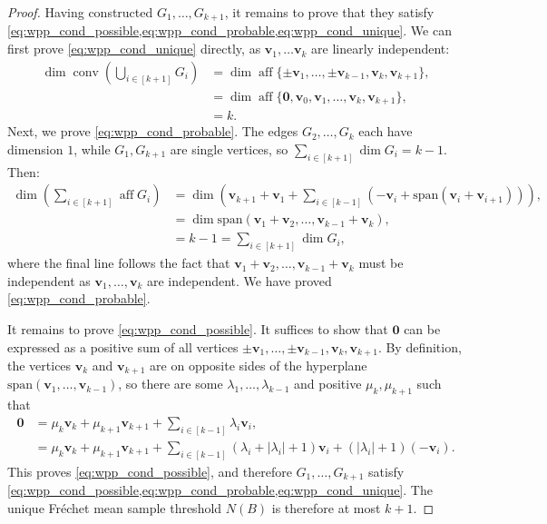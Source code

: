 \documentclass[10pt]{article}
\theoremstyle{definition}
\theoremstyle{remark}
\DeclareMathOperator{\conv}{conv}
\DeclareMathOperator{\aff}{aff}
\renewcommand{\vec}[1]{\mathbf{#1}}
\begin{document}
\begin{proof}
		Having constructed $G_1, \dots, G_{k+1}$, it remains to prove that they satisfy \cref{eq:wpp_cond_possible,eq:wpp_cond_probable,eq:wpp_cond_unique}. We can first prove \cref{eq:wpp_cond_unique} directly, as $\vec v_1, \dots \vec v_k$ are linearly independent:
		\begin{align*}
			\dim \conv \left( \textstyle\bigcup_{i \in [k+1]} G_i  \right) &= \dim \aff \{ \pm \vec v_1, \dots, \pm \vec v_{k-1}, \vec v_k, \vec v_{k+1} \}, \\
			&= \dim \aff \{\vec 0, \vec v_0, \vec v_1, \dots, \vec v_k, \vec v_{k+1} \}, \\
			&= k.
		\end{align*}
		Next, we prove \cref{eq:wpp_cond_probable}. The edges $G_2, \dots, G_k$ each have dimension $1$, while $G_1, G_{k+1}$ are single vertices, so $\sum_{i \in [k+1]} \dim G_i = k-1$. Then:
		\begin{align*}
			\dim \left(\textstyle\sum_{i \in [k+1]} \aff G_i \right) &= \dim \left(\vec v_{k+1} + \vec v_1 + \textstyle\sum_{i \in [k-1]} (-\vec v_i + \text{span}(\vec v_i + \vec v_{i+1})) \right),\\
			&= \dim \text{span}(\vec v_1 + \vec v_2, \dots, \vec v_{k-1} + \vec v_{k}),\\
			&= k-1 = \textstyle \sum_{i \in [k+1]} \dim G_i,
		\end{align*}
		where the final line follows the fact that $\vec v_1 + \vec v_2, \dots, \vec v_{k-1} + \vec v_{k}$ must be independent as $\vec v_1, \dots, \vec v_k$ are independent. We have proved \cref{eq:wpp_cond_probable}. 
		
		It remains to prove \cref{eq:wpp_cond_possible}. It suffices to show that $\vec 0$ can be expressed as a positive sum of all vertices $\pm \vec v_1, \dots, \pm \vec v_{k-1}, \vec v_k, \vec v_{k+1}$. By definition, the vertices $\vec v_k$ and $\vec v_{k+1}$ are on opposite sides of the hyperplane $\text{span}(\vec v_1, \dots, \vec v_{k-1})$, so there are some $\lambda_1, \dots, \lambda_{k-1}$ and positive $\mu_k, \mu_{k+1}$ such that 
		\begin{align*}
			\vec 0 &= \mu_k \vec v_k + \mu_{k+1} \vec v_{k+1} + \textstyle\sum_{i \in [k-1]} \lambda_i \vec v_i, \\
			&= \mu_k \vec v_k + \mu_{k+1} \vec v_{k+1} + \textstyle\sum_{i \in [k-1]} (\lambda_i + |\lambda_i|+1) \vec v_i + (|\lambda_i| + 1)(-\vec v_i).
		\end{align*}
		This proves \cref{eq:wpp_cond_possible}, and therefore $G_1, \dots, G_{k+1}$ satisfy \cref{eq:wpp_cond_possible,eq:wpp_cond_probable,eq:wpp_cond_unique}. The unique Fr\'echet mean sample threshold $N(B)$ is therefore at most $k+1$.
	\end{proof}
	
\end{document}
